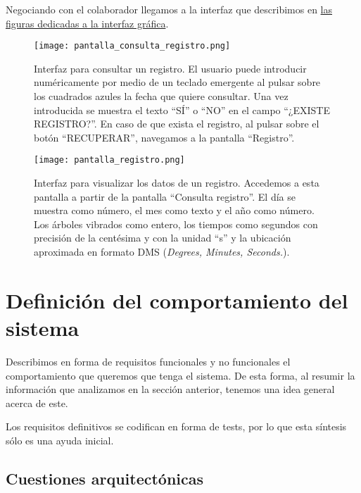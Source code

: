 Negociando con el colaborador llegamos a la interfaz que describimos
en \hyperref[fig:interfaz_gráfica]{las figuras dedicadas a la interfaz
gráfica}.

\begin{figure}[!b]
    \begin{minipage}[b]{0.48\textwidth}
        \texttt{[image: pantalla\_consulta\_registro.png]}
        \caption{Interfaz para consultar un registro. El usuario puede
        introducir numéricamente por medio de un teclado emergente al pulsar
        sobre los cuadrados azules la fecha que quiere consultar. Una vez
        introducida se muestra el texto ``SÍ'' o ``NO'' en el campo ``¿EXISTE REGISTRO?''.
        En caso de que exista el registro, al pulsar sobre el botón ``RECUPERAR'',
        navegamos a la pantalla ``Registro''.}
    \end{minipage}
    \hfill
    \begin{minipage}[b]{0.48\textwidth}
        \texttt{[image: pantalla\_registro.png]}
        \caption{Interfaz para visualizar los datos de un registro. Accedemos
        a esta pantalla a partir de la pantalla ``Consulta registro''. El día
        se muestra como número, el mes como texto y el año como número.
        Los árboles vibrados como entero, los tiempos como segundos con 
        precisión de la centésima y con la unidad ``s'' y la ubicación
        aproximada en formato DMS (\textit{\textit{Degrees, Minutes, Seconds.}}).}
    \end{minipage}
    \label{fig:interfaz_gráfica}
\end{figure}

\section{Definición del comportamiento del sistema}

Describimos en forma de requisitos funcionales y no funcionales el
comportamiento que queremos que tenga el sistema. De esta forma, al resumir
la información que analizamos en la sección anterior, tenemos una
idea general acerca de este.

Los requisitos definitivos se codifican en forma de tests, por lo que
esta síntesis sólo es una ayuda inicial.

\subsection{Cuestiones arquitectónicas}

